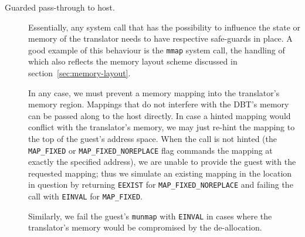 \begin{description}
	
	\item[Guarded pass-through to host.]
	Essentially, any system call that has the possibility to influence the state or memory of the translator needs to have respective safe-guards in place.
	A good example of this behaviour is the \texttt{mmap} system call, the handling of which also reflects the memory layout scheme discussed in section~\vref{sec:memory-layout}.
	
	In any case, we must prevent a memory mapping into the translator's memory region.
	Mappings that do not interfere with the DBT's memory can be passed along to the host directly.
	In case a hinted mapping would conflict with the translator's memory, we may just re-hint the mapping to the top of the guest's address space.
	When the call is not hinted (the \texttt{MAP\_FIXED} or \texttt{MAP\_FIXED\_NOREPLACE} flag commands the mapping at exactly the specified address), we are unable to provide the guest with the requested mapping;
	thus we simulate an existing mapping in the location in question by returning \texttt{EEXIST} for \texttt{MAP\_FIXED\_NOREPLACE} and failing the call with \texttt{EINVAL} for \texttt{MAP\_FIXED}.
	
	Similarly, we fail the guest's \texttt{munmap} with \texttt{EINVAL} in cases where the translator's memory would be compromised by the de-allocation.
\end{description}

